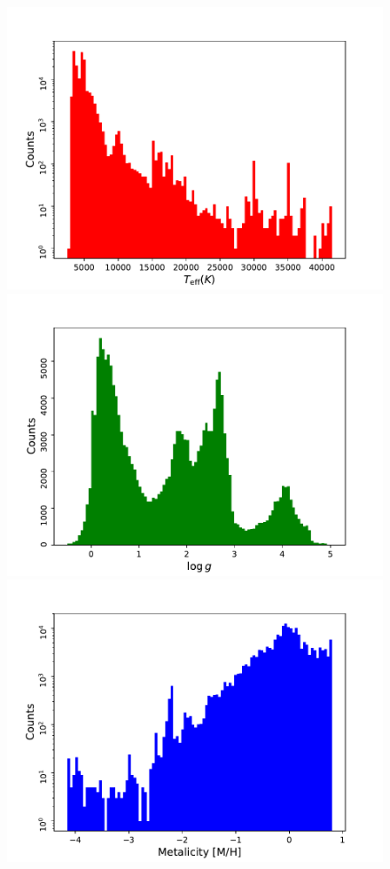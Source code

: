 \documentclass{aa}
\begin{document}
\begin{figure}
\includegraphics[width=\columnwidth]{figs/gaia/t_eff.pdf}
  \includegraphics[width=\columnwidth]{figs/gaia/logg.pdf}\\
  \includegraphics[width=\columnwidth]{figs/gaia/metalicity.pdf}\\

\end{figure}
\end{document}
